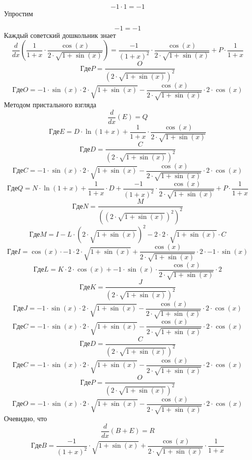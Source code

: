 \documentclass[12pt, a4paper]{article}
\begin{document}
\begin{equation}
-1 \cdot 1 = -1
\end{equation}
Упростим

\begin{equation}
-1 = -1
\end{equation}
Каждый советский дошкольник знает
\begin{equation}
\frac{d}{dx}(\frac{1}{1+x} \cdot \frac{\cos(x)}{2 \cdot \sqrt{1+\sin(x)}}) = \frac{-1}{{(1+x)}^{2}} \cdot \frac{\cos(x)}{2 \cdot \sqrt{1+\sin(x)}}+P \cdot \frac{1}{1+x}
\end{equation}
$$Где P = \frac{O}{{(2 \cdot \sqrt{1+\sin(x)})}^{2}}$$
$$Где O = -1 \cdot \sin(x) \cdot 2 \cdot \sqrt{1+\sin(x)}-\frac{\cos(x)}{2 \cdot \sqrt{1+\sin(x)}} \cdot 2 \cdot \cos(x)$$
Методом пристального взгляда
\begin{equation}
\frac{d}{dx}(E) = Q
\end{equation}
$$Где E = D \cdot \ln(1+x)+\frac{1}{1+x} \cdot \frac{\cos(x)}{2 \cdot \sqrt{1+\sin(x)}}$$
$$Где D = \frac{C}{{(2 \cdot \sqrt{1+\sin(x)})}^{2}}$$
$$Где C = -1 \cdot \sin(x) \cdot 2 \cdot \sqrt{1+\sin(x)}-\frac{\cos(x)}{2 \cdot \sqrt{1+\sin(x)}} \cdot 2 \cdot \cos(x)$$
$$Где Q = N \cdot \ln(1+x)+\frac{1}{1+x} \cdot D+\frac{-1}{{(1+x)}^{2}} \cdot \frac{\cos(x)}{2 \cdot \sqrt{1+\sin(x)}}+P \cdot \frac{1}{1+x}$$
$$Где N = \frac{M}{{({(2 \cdot \sqrt{1+\sin(x)})}^{2})}^{2}}$$
$$Где M = I-L \cdot {(2 \cdot \sqrt{1+\sin(x)})}^{2}-2 \cdot 2 \cdot \sqrt{1+\sin(x)} \cdot C$$
$$Где I = \cos(x) \cdot -1 \cdot 2 \cdot \sqrt{1+\sin(x)}+\frac{\cos(x)}{2 \cdot \sqrt{1+\sin(x)}} \cdot 2 \cdot -1 \cdot \sin(x)$$
$$Где L = K \cdot 2 \cdot \cos(x)+-1 \cdot \sin(x) \cdot \frac{\cos(x)}{2 \cdot \sqrt{1+\sin(x)}} \cdot 2$$
$$Где K = \frac{J}{{(2 \cdot \sqrt{1+\sin(x)})}^{2}}$$
$$Где J = -1 \cdot \sin(x) \cdot 2 \cdot \sqrt{1+\sin(x)}-\frac{\cos(x)}{2 \cdot \sqrt{1+\sin(x)}} \cdot 2 \cdot \cos(x)$$
$$Где C = -1 \cdot \sin(x) \cdot 2 \cdot \sqrt{1+\sin(x)}-\frac{\cos(x)}{2 \cdot \sqrt{1+\sin(x)}} \cdot 2 \cdot \cos(x)$$
$$Где D = \frac{C}{{(2 \cdot \sqrt{1+\sin(x)})}^{2}}$$
$$Где C = -1 \cdot \sin(x) \cdot 2 \cdot \sqrt{1+\sin(x)}-\frac{\cos(x)}{2 \cdot \sqrt{1+\sin(x)}} \cdot 2 \cdot \cos(x)$$
$$Где P = \frac{O}{{(2 \cdot \sqrt{1+\sin(x)})}^{2}}$$
$$Где O = -1 \cdot \sin(x) \cdot 2 \cdot \sqrt{1+\sin(x)}-\frac{\cos(x)}{2 \cdot \sqrt{1+\sin(x)}} \cdot 2 \cdot \cos(x)$$
Очевидно, что
\begin{equation}
\frac{d}{dx}(B+E) = R
\end{equation}
$$Где B = \frac{-1}{{(1+x)}^{2}} \cdot \sqrt{1+\sin(x)}+\frac{\cos(x)}{2 \cdot \sqrt{1+\sin(x)}} \cdot \frac{1}{1+x}$$
\end{document}
